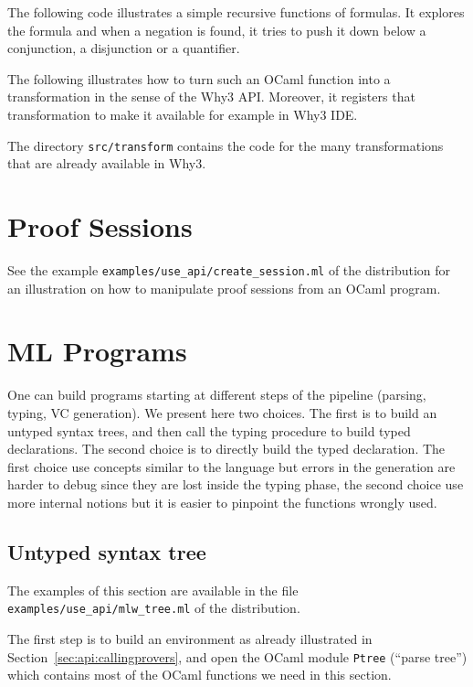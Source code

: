The following code illustrates a simple recursive functions of
formulas. It explores the formula and when a negation is found, it
tries to push it down below a conjunction, a disjunction or a
quantifier.


The following illustrates how to turn such an OCaml function into a
transformation in the sense of the Why3 API. Moreover, it registers that
transformation to make it available for example in Why3 IDE.


The directory \verb|src/transform| contains the code for the many
transformations that are already available in Why3.

\section{Proof Sessions}

See the example \verb|examples/use_api/create_session.ml| of the
distribution for an illustration on how to manipulate proof sessions
from an OCaml program.

\section{ML Programs}

One can build \whyml programs starting at different steps of the \whyml pipeline
(parsing, typing, VC generation). We present here two choices. The first is to build
an untyped syntax trees, and then
call the \why typing procedure to build typed declarations. The second choice is
to directly build the typed declaration. The first choice use concepts similar
to the \whyml language but errors in the generation are harder to debug since
they are lost inside the typing phase, the second choice use more internal
notions but it is easier to pinpoint the functions wrongly used.

\subsection{Untyped syntax tree}

The examples of this section are available in the file
\verb|examples/use_api/mlw_tree.ml| of the distribution.

The first step is to build an environment as already illustrated in
Section~\ref{sec:api:callingprovers}, and open the OCaml module
\verb|Ptree| (``parse tree'') which contains most of the OCaml functions we need in
this section.


